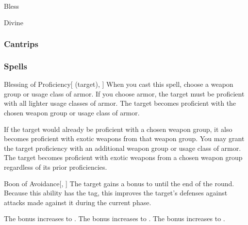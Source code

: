 \newpage
\begin{spellsection}{Bless}

\begin{spellheader}
\end{spellheader}


 Divine

\subsubsection{Cantrips}


\end{spellsection}


\subsubsection{Spells}


\lowercase{\hypertarget{spell:Blessing of Proficiency}{}}\label{spell:Blessing of Proficiency}
\begin{attuneability}[Rank 1]{\hypertarget{spell:Blessing of Proficiency}{Blessing of Proficiency}}[ (target), ]
When you cast this spell, choose a weapon group or usage class of armor.
If you choose armor, the target must be proficient with all lighter usage classes of armor.
The target becomes proficient with the chosen weapon group or usage class of armor.

\rankline
{} If the target would already be proficient with a chosen weapon group, it also becomes proficient with exotic weapons from that weapon group.
 You may grant the target proficiency with an additional weapon group or usage class of armor.
 The target becomes proficient with exotic weapons from a chosen weapon group regardless of its prior proficiencies.

\end{attuneability}
\vspace{0.25em}



\lowercase{\hypertarget{spell:Boon of Avoidance}{}}\label{spell:Boon of Avoidance}
\begin{freeability}[Rank 1]{\hypertarget{spell:Boon of Avoidance}{Boon of Avoidance}}[, ]
The target gains a  bonus to  until the end of the round.
Because this ability has the  tag, this improves the target's defenses against attacks made against it during the current phase.

\rankline
{} The bonus increases to .
 The bonus increases to .
 The bonus increases to .

\end{freeability}
\vspace{0.25em}



